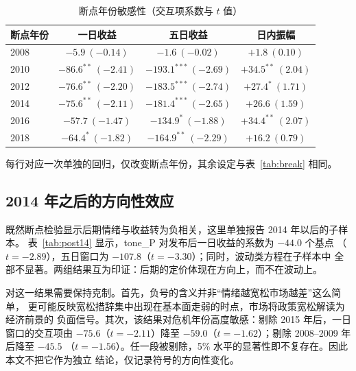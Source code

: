 \begin{table}[htbp]
\centering
\small
\begin{threeparttable}
\caption{断点年份敏感性（交互项系数与 $t$ 值）}
\label{tab:breaksens}
\begin{tabular}{lccc}
\toprule
断点年份 & 一日收益 & 五日收益 & 日内振幅 \\
\midrule
2008 & $-5.9\ (-0.14)$   & $-1.6\ (-0.02)$    & $+1.8\ (0.10)$ \\
2010 & $-86.6^{**}\ (-2.41)$ & $-193.1^{***}\ (-2.69)$ & $+34.5^{**}\ (2.04)$ \\
2012 & $-76.6^{**}\ (-2.20)$ & $-183.5^{***}\ (-2.74)$ & $+27.4^{*}\ (1.71)$ \\
2014 & $-75.6^{**}\ (-2.11)$ & $-181.4^{***}\ (-2.65)$ & $+26.6\ (1.59)$ \\
2016 & $-57.7\ (-1.47)$  & $-134.9^{*}\ (-1.88)$   & $+34.4^{**}\ (2.07)$ \\
2018 & $-64.4^{*}\ (-1.82)$ & $-164.9^{**}\ (-2.29)$ & $+16.2\ (0.79)$ \\
\bottomrule
\end{tabular}
\begin{tablenotes}[flushleft]
\footnotesize
\item 每行对应一次单独的回归，仅改变断点年份，其余设定与表~\ref{tab:break} 相同。
\end{tablenotes}
\end{threeparttable}
\end{table}

\subsection{2014 年之后的方向性效应}

既然断点检验显示后期情绪与收益转为负相关，这里单独报告 2014 年以后的子样本。
表~\ref{tab:post14} 显示，tone\_P 对发布后一日收益的系数为 $-44.0$ 个基点
（$t=-2.89$），五日窗口为 $-107.8$（$t=-3.30$）；同时，波动类方程在子样本中
全部不显著。两组结果互为印证：后期的定价体现在方向上，而不在波动上。

对这一结果需要保持克制。首先，负号的含义并非``情绪越宽松市场越差''这么简单，
更可能反映宽松措辞集中出现在基本面走弱的时点，市场将政策宽松解读为经济前景的
负面信号。其次，该结果对危机年份高度敏感：剔除 2015 年后，一日窗口的交互项由
$-75.6$（$t=-2.11$）降至 $-59.0$（$t=-1.62$）；剔除 2008--2009 年后降至 $-45.5$
（$t=-1.56$）。任一段被剔除，5\% 水平的显著性即不复存在。因此本文不把它作为独立
结论，仅记录符号的方向性变化。

